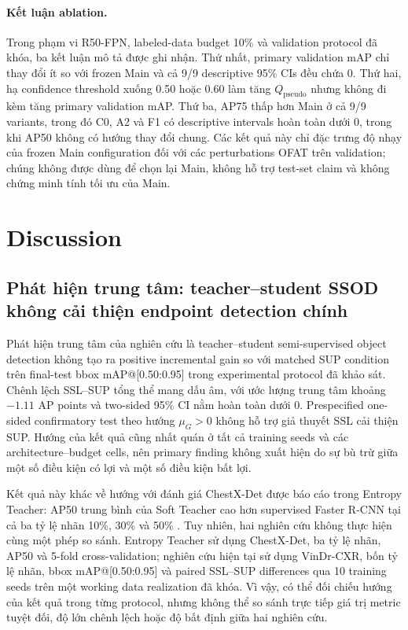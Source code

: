 \documentclass[pdflatex,sn-mathphys-num]{sn-jnl}%
\theoremstyle{thmstyleone}%
\theoremstyle{thmstyletwo}%
\theoremstyle{thmstylethree}%
\begin{document}
\paragraph{Kết luận ablation.}
Trong phạm vi R50-FPN, labeled-data budget 10\% và validation protocol đã khóa, ba kết luận mô tả được ghi nhận. Thứ nhất, primary validation mAP chỉ thay đổi ít so với frozen Main và cả 9/9 descriptive 95\% CIs đều chứa 0. Thứ hai, hạ confidence threshold xuống 0.50 hoặc 0.60 làm tăng $Q_{\mathrm{pseudo}}$ nhưng không đi kèm tăng primary validation mAP. Thứ ba, AP75 thấp hơn Main ở cả 9/9 variants, trong đó C0, A2 và F1 có descriptive intervals hoàn toàn dưới 0, trong khi AP50 không có hướng thay đổi chung. Các kết quả này chỉ đặc trưng độ nhạy của frozen Main configuration đối với các perturbations OFAT trên validation; chúng không được dùng để chọn lại Main, không hỗ trợ test-set claim và không chứng minh tính tối ưu của Main.

\section{Discussion}
\label{sec:discussion}

\subsection{Phát hiện trung tâm: teacher--student SSOD không cải thiện endpoint detection chính}

Phát hiện trung tâm của nghiên cứu là teacher--student semi-supervised object detection không tạo ra positive incremental gain so với matched SUP condition trên final-test bbox mAP@[0.50:0.95] trong experimental protocol đã khảo sát. Chênh lệch SSL--SUP tổng thể mang dấu âm, với ước lượng trung tâm khoảng $-1.11$ AP points và two-sided 95\% CI nằm hoàn toàn dưới 0. Prespecified one-sided confirmatory test theo hướng $\mu_G>0$ không hỗ trợ giả thuyết SSL cải thiện SUP. Hướng của kết quả cũng nhất quán ở tất cả training seeds và các architecture--budget cells, nên primary finding không xuất hiện do sự bù trừ giữa một số điều kiện có lợi và một số điều kiện bất lợi.

Kết quả này khác về hướng với đánh giá ChestX-Det được báo cáo trong Entropy Teacher: AP50 trung bình của Soft Teacher cao hơn supervised Faster R-CNN tại cả ba tỷ lệ nhãn 10\%, 30\% và 50\% \cite{zhu2025entropy}. Tuy nhiên, hai nghiên cứu không thực hiện cùng một phép so sánh. Entropy Teacher sử dụng ChestX-Det, ba tỷ lệ nhãn, AP50 và 5-fold
cross-validation; nghiên cứu hiện tại sử dụng VinDr-CXR, bốn tỷ lệ nhãn, bbox mAP@[0.50:0.95] và paired SSL--SUP differences qua 10 training seeds trên một working data realization đã khóa. Vì vậy, có thể đối chiếu hướng của kết quả trong từng protocol, nhưng không thể so sánh trực tiếp giá trị metric tuyệt đối, độ lớn chênh lệch hoặc độ bất định giữa hai nghiên cứu.
\end{document}

